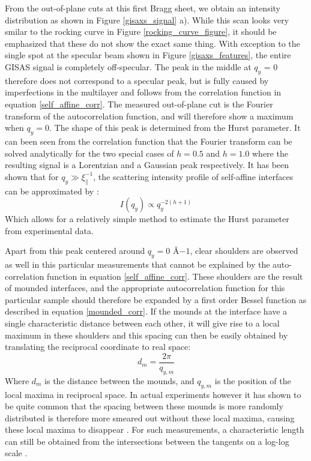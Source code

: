 From the out-of-plane cuts at this first Bragg sheet, we obtain an intensity distribution as shown in Figure \ref{gisaxs_signal} a). While this scan looks very smilar to the rocking curve in Figure \ref{rocking_curve_figure}, it should be emphasized that these do not show the exact same thing. With exception to the single spot at the specular beam shown in Figure \ref{gisaxs_features}, the entire GISAS signal is completely off-specular. The peak in the middle at $q_y$ = 0 therefore does not correspond to a specular peak, but is fully caused by imperfections in the multilayer and follows from the correlation function in equation \ref{self_affine_corr}. The measured out-of-plane cut is the Fourier transform of the autocorrelation function, and will therefore show a maximum when $q_y = 0$. The shape of this peak is determined from the Hurst parameter. It can been seen from the correlation function that the Fourier transform can be solved analytically for the two special cases of $h = 0.5$ and $h = 1.0$ where the resulting signal is a Lorentzian and a Gaussian peak respectively. It has been shown that for $q_y \gg \xi_{\parallel}^{-1}$, the scattering intensity profile of self-affine interfaces can be approximated by \cite{determine_hurst}: 
\begin{equation}
	I(q_y) \propto q_y^{-2(h+1)}
\end{equation}
Which allows for a relatively simple method to estimate the Hurst parameter from experimental data.

Apart from this peak centered around $q_y = 0$ $Å{-1}$, clear shoulders are observed as well in this particular measurements that cannot be explained by the auto-correlation function in equation \ref{self_affine_corr}. These shoulders are the result of mounded interfaces, and the appropriate autocorrelation function for this particular sample should therefore be expanded by a first order Bessel function as described in equation \ref{mounded_corr}. If the mounds at the interface have a single characteristic distance between each other, it will give rise to a local maximum in these shoulders and this spacing can then be easily obtained by translating the reciprocal coordinate to real space:
\begin{equation}
	d_m = \frac{2\pi}{q_{y,m}}
\end{equation}
Where $d_m$ is the distance between the mounds, and $q_{y,m}$ is the position of the local maxima in reciprocal space. In actual experiments however it has shown to be quite common that the spacing between these mounds is more randomly distributed is therefore more smeared out without these local maxima, causing these local maxima to disappear \cite{zhao2000characterization}. For such measurements, a characteristic length can still be obtained from the intersections between the tangents on a log-log scale \cite{char_length}. 

